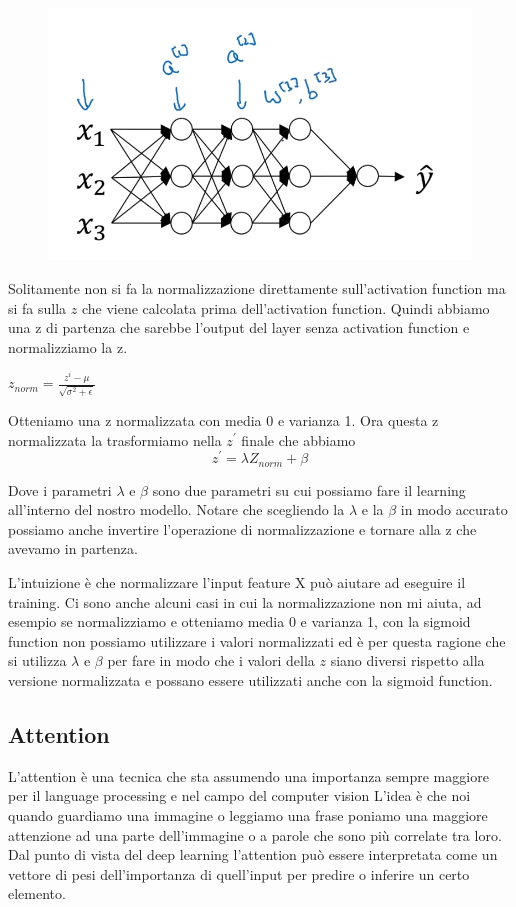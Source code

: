 \documentclass[14pt]{extreport}
\begin{document}
\begin{figure}[H] 
\centering
\includegraphics[width=0.7\linewidth]{569.jpeg}
\end{figure}

Solitamente non si fa la normalizzazione direttamente sull'activation function ma si fa sulla $z$ che viene calcolata prima 
dell'activation function.
Quindi abbiamo una z di partenza che sarebbe l'output del layer senza activation function e normalizziamo la z.

$z_{norm} = \frac{z^{i} - \mu}{\sqrt{\sigma^2 + \epsilon }}$

Otteniamo una z normalizzata con media 0 e varianza 1. Ora questa z normalizzata la trasformiamo nella $z^{'}$ finale che abbiamo 
$$z^{'} = \lambda Z_{norm} + \beta$$

Dove i parametri $\lambda$ e $\beta$ sono due parametri su cui possiamo fare il learning all'interno del nostro modello.
Notare che scegliendo la $\lambda$ e la $\beta$ in modo accurato possiamo anche invertire l'operazione di normalizzazione e tornare alla 
z che avevamo in partenza.

L'intuizione è che normalizzare l'input feature X può aiutare ad eseguire il training.
Ci sono anche alcuni casi in cui la normalizzazione non mi aiuta, ad esempio se normalizziamo e otteniamo media 0 e varianza 1,
con la sigmoid function non possiamo utilizzare i valori normalizzati ed è per questa ragione che si utilizza $\lambda$ e $\beta$ per 
fare in modo che i valori della $z$ siano diversi rispetto alla versione normalizzata e possano essere utilizzati anche con la sigmoid function.

\subsection{Attention}

L'attention è una tecnica che sta assumendo una importanza sempre maggiore per il language processing e nel campo del computer vision
L'idea è che noi quando guardiamo una immagine o leggiamo una frase poniamo una maggiore attenzione ad una parte dell'immagine o a parole che sono
più correlate tra loro.
Dal punto di vista del deep learning l'attention può essere interpretata come un vettore di pesi dell'importanza di quell'input
per predire o inferire un certo elemento.
\end{document}
